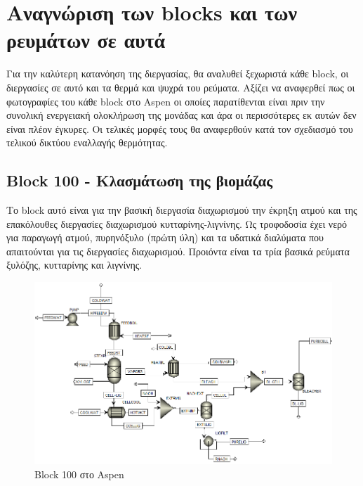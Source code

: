 \documentclass[11pt]{article}
\begin{document}
\section{Αναγνώριση των blocks και των ρευμάτων σε αυτά}
\label{sec:org258461e}
Για την καλύτερη κατανόηση της διεργασίας, θα αναλυθεί ξεχωριστά κάθε block, οι διεργασίες σε αυτό και τα θερμά και ψυχρά του ρεύματα. Αξίζει να αναφερθεί πως οι φωτογραφίες του κάθε block στο Aspen οι οποίες παρατίθενται είναι πριν την συνολική ενεργειακή ολοκλήρωση της μονάδας και άρα οι περισσότερες εκ αυτών δεν είναι πλέον έγκυρες. Οι τελικές μορφές τους θα αναφερθούν κατά τον σχεδιασμό του τελικού δικτύου εναλλαγής θερμότητας.

\subsection{Block 100 - Κλασμάτωση της βιομάζας}
\label{sec:org10ba554}
Το block αυτό είναι για την βασική διεργασία διαχωρισμού την έκρηξη ατμού και της επακόλουθες διεργασίες διαχωρισμού κυτταρίνης-λιγνίνης. Ως τροφοδοσία έχει νερό για παραγωγή ατμού, πυρηνόξυλο (πρώτη ύλη) και τα υδατικά διαλύματα που απαιτούνται για τις διεργασίες διαχωρισμού. Προιόντα είναι τα τρία βασικά ρεύματα ξυλόζης, κυτταρίνης και λιγνίνης.

\begin{figure}[htbp]
\centering
\includegraphics[width=.9\linewidth]{Block_100_-_Διαχωρισμός_των_τριών_κομματιών_της_βιομάζας/2023-03-11_15-21-38_screenshot.png}
\caption{Block 100 στο Aspen}
\end{figure}
\end{document}

